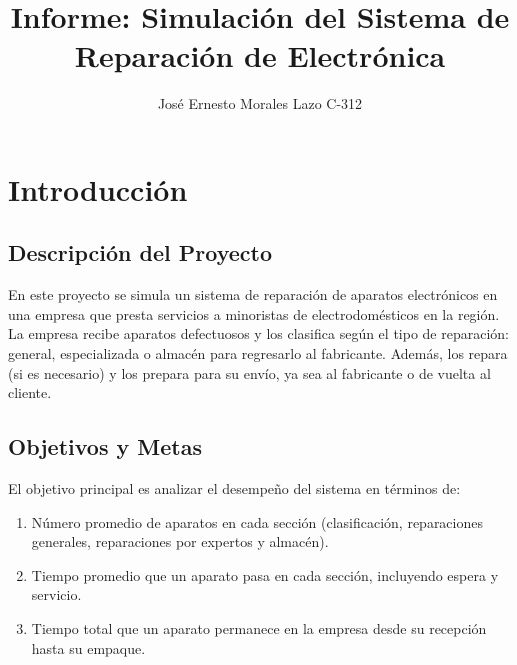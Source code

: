 \documentclass[12pt]{article}
\title{Informe: Simulación del Sistema de Reparación de Electrónica}
\author{José Ernesto Morales Lazo C-312}
\begin{document}
\maketitle 
\newpage

\section{Introducción}

\subsection{Descripción del Proyecto}
En este proyecto se simula un sistema de reparación de aparatos electrónicos en una empresa que presta servicios a minoristas de electrodomésticos en la región. La empresa recibe aparatos defectuosos y los clasifica según el tipo de reparación: general, especializada o almacén para regresarlo al fabricante. Además, los repara (si es necesario) y los prepara para su envío, ya sea al fabricante o de vuelta al cliente.

\subsection{Objetivos y Metas}
El objetivo principal es analizar el desempeño del sistema en términos de:
\begin{enumerate}
    \item Número promedio de aparatos en cada sección (clasificación, reparaciones generales, reparaciones por expertos y almacén).
    \item Tiempo promedio que un aparato pasa en cada sección, incluyendo espera y servicio.
    \item Tiempo total que un aparato permanece en la empresa desde su recepción hasta su empaque.
\end{enumerate}
\end{document}
